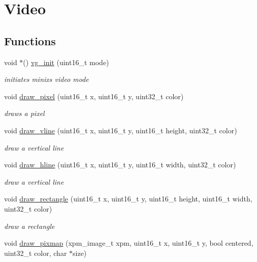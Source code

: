 \hypertarget{group__Video}{}\section{Video}
\label{group__Video}
\subsection*{Functions}
\begin{DoxyCompactItemize}
\item 
void $\ast$() \hyperlink{group__Video_gaa6c1ff5024cd4d15e476bce487584daa}{vg\+\_\+init} (uint16\+\_\+t mode)
\begin{DoxyCompactList}\small\item\em initiates minix\textquotesingle{}s video mode \end{DoxyCompactList}\item 
void \hyperlink{group__Video_ga18107cedb98361dc0fa1f2680d2e6536}{draw\+\_\+pixel} (uint16\+\_\+t x, uint16\+\_\+t y, uint32\+\_\+t color)
\begin{DoxyCompactList}\small\item\em draws a pixel \end{DoxyCompactList}\item 
void \hyperlink{group__Video_ga35c44a60865b65076c8de7007ed98a16}{draw\+\_\+vline} (uint16\+\_\+t x, uint16\+\_\+t y, uint16\+\_\+t height, uint32\+\_\+t color)
\begin{DoxyCompactList}\small\item\em draw a vertical line \end{DoxyCompactList}\item 
void \hyperlink{group__Video_ga734884458e765801966514410031e00b}{draw\+\_\+hline} (uint16\+\_\+t x, uint16\+\_\+t y, uint16\+\_\+t width, uint32\+\_\+t color)
\begin{DoxyCompactList}\small\item\em draw a vertical line \end{DoxyCompactList}\item 
void \hyperlink{group__Video_ga45710170c574300badfc04879210f4d4}{draw\+\_\+rectangle} (uint16\+\_\+t x, uint16\+\_\+t y, uint16\+\_\+t height, uint16\+\_\+t width, uint32\+\_\+t color)
\begin{DoxyCompactList}\small\item\em draw a rectangle \end{DoxyCompactList}\item 
void \hyperlink{group__Video_ga65cb3cc81804b640785e86116373a36c}{draw\+\_\+pixmap} (xpm\+\_\+image\+\_\+t xpm, uint16\+\_\+t x, uint16\+\_\+t y, bool centered, uint32\+\_\+t color, char $\ast$size)

\end{DoxyCompactItemize}
